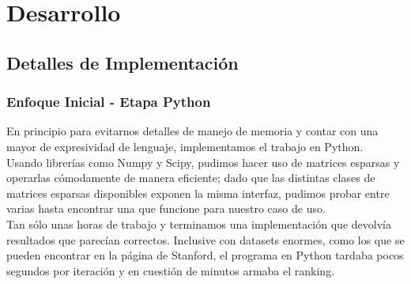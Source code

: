 \section{Desarrollo}

\subsection{Detalles de Implementación} %
\label{sub:detalles_de_implementaci_n}

\subsubsection{Enfoque Inicial - Etapa Python} %
\label{ssub:enfoque_inicial}

En principio para evitarnos detalles de manejo de memoria y contar con una mayor
de expresividad de lenguaje, implementamos el trabajo en Python.\\

Usando librerías como Numpy y Scipy, pudimos hacer uso de matrices
esparsas y operarlas cómodamente de manera eficiente; dado
que las distintas clases de matrices esparsas disponibles
exponen la misma interfaz, pudimos probar entre varias hasta encontrar
una que funcione para nuestro caso de uso.\\

Tan sólo unas horas de trabajo y terminamos una implementación
que devolvía resultados que parecían correctos. Inclusive con datasets
enormes, como los que se pueden encontrar en la página de Stanford,
el programa en Python tardaba pocos segundos por iteración y en cuestión de minutos armaba el ranking.\\

